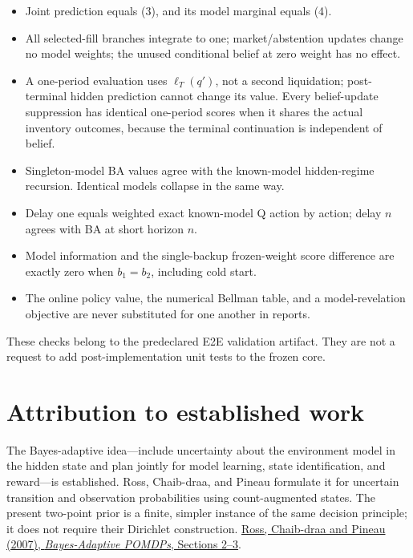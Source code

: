 \documentclass[10pt,a4paper]{article}
\begin{document}
\begin{itemize}
\item Joint prediction equals (3), and its model marginal equals (4).
\item All selected-fill branches integrate to one; market/abstention updates
  change no model weights; the unused conditional belief at zero weight has
  no effect.
\item A one-period evaluation uses $\ell_T(q')$, not a second liquidation;
  post-terminal hidden prediction cannot change its value. Every belief-update
  suppression has identical one-period scores when it shares the actual
  inventory outcomes, because the terminal continuation is independent of
  belief.
\item Singleton-model BA values agree with the known-model hidden-regime
  recursion. Identical models collapse in the same way.
\item Delay one equals weighted exact known-model Q action by action;
  delay $n$ agrees with BA at short horizon $n$.
\item Model information and the single-backup frozen-weight score difference are
  exactly zero when $b_1=b_2$, including cold start.
\item The online policy value, the numerical Bellman table, and a model-revelation
  objective are never substituted for one another in reports.
\end{itemize}

These checks belong to the predeclared E2E validation artifact. They are not a
request to add post-implementation unit tests to the frozen core.

\clearpage
\section{Attribution to established work}

The Bayes-adaptive idea---include uncertainty about the environment model in the
hidden state and plan jointly for model learning, state identification, and
reward---is established. Ross, Chaib-draa, and Pineau formulate it for uncertain
transition and observation probabilities using count-augmented states. The
present two-point prior is a finite, simpler instance of the same decision
principle; it does not require their Dirichlet construction.
\href{https://papers.nips.cc/paper_files/paper/2007/file/3b3dbaf68507998acd6a5a5254ab2d76-Paper.pdf}{Ross, Chaib-draa and Pineau (2007), \emph{Bayes-Adaptive POMDPs}, Sections 2--3}.
\end{document}
